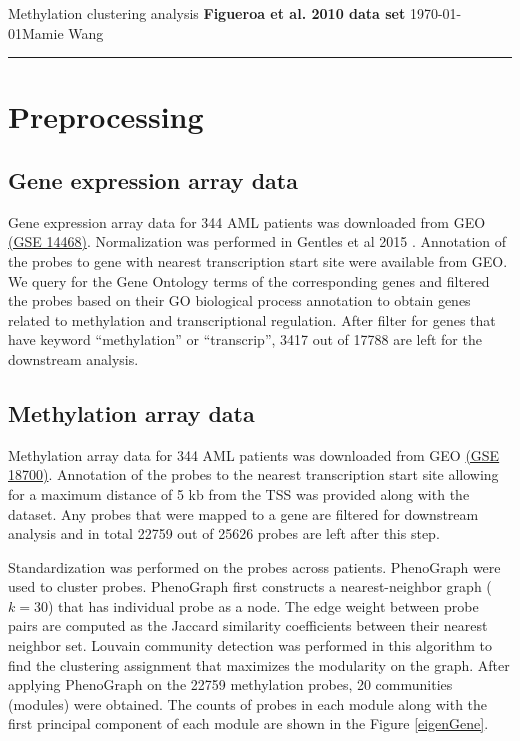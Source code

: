 \documentclass{article}
\begin{document}
\noindent
Methylation clustering analysis \hfill \textbf{Figueroa et al. 2010 data set} \newline 
\today \hfill Mamie Wang

\noindent
\rule{\linewidth}{0.4pt}

\listoffigures

\clearpage

\section{Preprocessing}

\subsection{Gene expression array data}

Gene expression array data for 344 AML patients was downloaded from GEO \href{https://www.ncbi.nlm.nih.gov/geo/query/acc.cgi?acc=GSE14468}{(GSE 14468)}. Normalization was performed in Gentles et al 2015 \cite{gentles2015prognostic}. Annotation of the probes to gene with nearest transcription start site were available from GEO. We query for the Gene Ontology terms of the corresponding genes and filtered the probes based on their GO biological process annotation to obtain genes related to methylation and transcriptional regulation. After filter for genes that have keyword ``methylation'' or ``transcrip'', 3417 out of 17788 are left for the downstream analysis. 

\subsection{Methylation array data}

Methylation array data for 344 AML patients was downloaded from GEO \href{https://www.ncbi.nlm.nih.gov/geo/query/acc.cgi?acc=GSE18700}{(GSE 18700)}. Annotation of the probes to the nearest transcription start site allowing for a maximum distance of 5 kb from the TSS was provided along with the dataset. Any probes that were mapped to a gene are filtered for downstream analysis and in total 22759 out of 25626 probes are left after this step. 

Standardization was performed on the probes across patients. %
PhenoGraph \cite{levine2015data} were used to cluster probes. PhenoGraph first constructs a nearest-neighbor graph ($k = 30$) that has individual probe as a node. The edge weight between probe pairs are computed as the Jaccard similarity coefficients between their nearest neighbor set. Louvain community detection was performed in this algorithm to find the clustering assignment that maximizes the modularity on the graph. After applying PhenoGraph on the 22759 methylation probes, 20 communities (modules) were obtained. The counts of probes in each module along with the first principal component of each module are shown in the Figure \ref{eigenGene}. 
\end{document}
